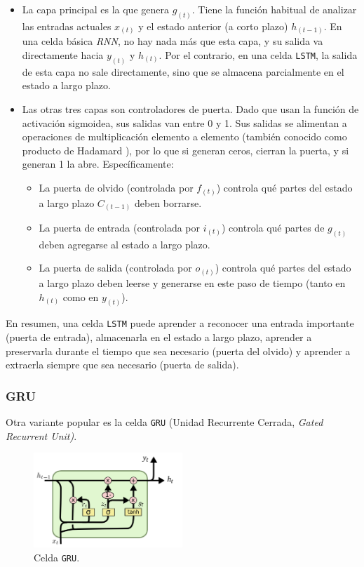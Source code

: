 \documentclass[a4paper,12pt]{article}
\begin{document}
\begin{itemize}[noitemsep, topsep=2pt]
	\item La capa principal es la que genera $g_{(t)}$. Tiene la función habitual de analizar las entradas actuales $x_{(t)}$ y el estado anterior (a corto plazo) $h_{(t-1)}$. En una celda básica \textit{RNN}, no hay nada más que esta capa, y su salida va directamente hacia $y_{(t)}$ y $h_{(t)}$. Por el contrario, en una celda \texttt{LSTM}, la salida de esta capa no sale directamente, sino que se almacena parcialmente en el estado a largo plazo.
	\item Las otras tres capas son controladores de puerta. Dado que usan la función de activación sigmoidea, sus salidas van entre 0 y 1. Sus salidas se alimentan a operaciones de multiplicación elemento a elemento (también conocido como producto de Hadamard \citep{hadamard}), por lo que si generan ceros, cierran la puerta, y si generan 1 la abre. Específicamente:
	      \begin{itemize}[noitemsep, topsep=2pt]
	      	\item La puerta de olvido (controlada por $f_{(t)}$) controla qué partes del estado a largo plazo $C_{(t-1)}$ deben borrarse.
	      	\item La puerta de entrada (controlada por $i_{(t)}$) controla qué partes de $g_{(t)}$ deben agregarse al estado a largo plazo.
	      	\item La puerta de salida (controlada por $o_{(t)}$) controla qué partes del estado a largo plazo deben leerse y generarse en este paso de tiempo (tanto en $h_{(t)}$ como en $y_{(t)}$).
	      \end{itemize}
\end{itemize}

En resumen, una celda \texttt{LSTM} puede aprender a reconocer una entrada importante (puerta de entrada), almacenarla en el estado a largo plazo, aprender a preservarla durante el tiempo que sea necesario (puerta del olvido) y aprender a extraerla siempre que sea necesario (puerta de salida).

\subsubsection{GRU}

Otra variante popular es la celda \texttt{GRU} (Unidad Recurrente Cerrada, \textit{Gated Recurrent Unit)}. \citep{olahlstm}

\begin{figure}[H]
	\begin{center}				
		\includegraphics[width=0.5\textwidth]{gru2.png}
		\caption{Celda \texttt{GRU}. \citep{olahlstm}}
		\label{fig:lstm5}
	\end{center}
\end{figure}
\end{document}
